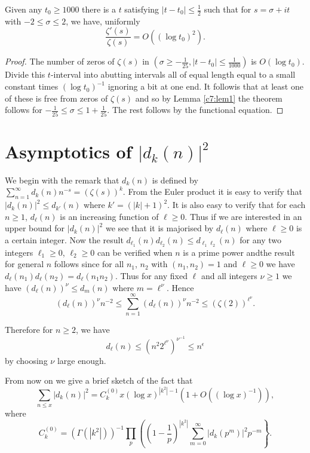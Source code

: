 \begin{theorem}\label{c7:thm7.5.2}
Given any $t_{0}\geq 1000$ there is a $t$ satisfying $|t-t_{0}|\leq
\frac{1}{2}$ such that for $s=\sigma+it$ with $-2\leq \sigma\leq 2$,
we have, uniformly
$$
\frac{\zeta'(s)}{\zeta(s)}=O((\log t_{0})^{2}).
$$
\end{theorem}

\begin{proof}
The number of zeros of $\zeta(s)$ in $(\sigma\geq
-\frac{1}{25},|t-t_{0}|\leq \frac{1}{1000})$ is $O(\log
t_{0})$. Divide this $t$-interval into abutting intervals all of equal
length equal to a small constant times $(\log t_{0})^{-1}$ ignoring a
bit at one end. It followis that at least one of these is free from
zeros of $\zeta(s)$ and so by Lemma \ref{c7:lem1} the theorem
follows for $-\frac{1}{25}\leq \sigma\leq 1+\frac{1}{25}$. The rest
follows by the functional equation. 
\end{proof}

\section{Asymptotics of $|d_{k}(n)|^{2}$}\label{c7:sec7.6}

We begin with the remark that $d_{k}(n)$ is defined by
$\sum\limits^{\infty}_{n=1}d_{k}(n)n^{-s}=(\zeta(s))^{k}$. From the
Euler product it is easy to verify that $|d_{k}(n)|^{2}\leq d_{k'}(n)$
where $k'=(|k|+1)^{2}$. It is also easy to verify that for each $n\geq
1$, $d_{\ell}(n)$ is an increasing function of $\ell\geq 0$. Thus if
we are interested in an upper bound for $|d_{k}(n)|^{2}$ we see that
it is majorised by $d_{\ell}(n)$ where $\ell\geq 0$ is a certain
integer. Now the result $d_{\ell_{1}}(n)d_{\ell_{2}}(n)\leq
d_{\ell_{1}\ell_{2}}(n)$ for any two integers $\ell_{1}\geq 0$,
$\ell_{2}\geq 0$ can be verified when $n$ is a prime power
and\pageoriginale the result for general $n$ follows since for all
$n_{1}$, $n_{2}$ with $(n_{1},n_{2})=1$ and $\ell\geq 0$ we have
$d_{\ell}(n_{1})d_{\ell}(n_{2})=d_{\ell}(n_{1}n_{2})$. Thus for any
fixed $\ell$ and all integers $\nu\geq 1$ we have
$(d_{\ell}(n))^{\nu}\leq d_{m}(n)$ where $m=\ell^{\nu}$. Hence
$$
(d_{\ell}(n))^{\nu}n^{-2}\leq
\sum^{\infty}_{n=1}(d_{\ell}(n))^{\nu}n^{-2}\leq
(\zeta(2))^{\ell^{\nu}}.
$$

Therefore for $n\geq 2$, we have
$$
d_{\ell}(n)\leq (n^{2}2^{\ell^{\nu}})^{\nu^{-1}}\leq n^{\epsilon}
$$
by choosing $\nu$ large enough.

From now on we give a brief sketch of the fact that
$$
\sum_{n\leq x}|d_{k}(n)|^{2}=C^{(0)}_{k}x(\log
x)^{|k^{2}|-1}(1+O((\log x)^{-1})),
$$
where 
$$
C^{(0)}_{k}=(\Gamma(|k^{2}|))^{-1}\prod_{p}\left(\left(1-\frac{1}{p}\right)^{|k^{2}|}\sum^{\infty}_{m=0}|d_{k}(p^{m})|^{2}p^{-m}\right\}.
$$

